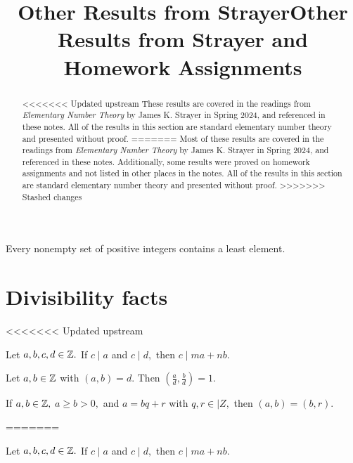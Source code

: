 \documentclass[letterpaper, 11 pt]{ximera}
\title{Other Results from Strayer}
\title{Other Results from Strayer and Homework Assignments}
\begin{document}
\begin{abstract}
<<<<<<< Updated upstream
    These results are covered in the readings from \emph{Elementary Number Theory} by James K. Strayer in Spring 2024, and referenced in these notes. All of the results in this section are standard elementary number theory and presented without proof. 
=======
    Most of these results are covered in the readings from \emph{Elementary Number Theory} by James K. Strayer in Spring 2024, and referenced in these notes. Additionally, some results were proved on homework assignments and not listed in other places in the notes.
    All of the results in this section are standard elementary number theory and presented without proof. 
>>>>>>> Stashed changes
\end{abstract}

\maketitle

\begin{axiom}\label{well-order}
    Every nonempty set of positive integers contains a least element.
\end{axiom}

\section{Divisibility facts}\label{sec:additional-div}

<<<<<<< Updated upstream
    \begin{lem*}[Proposition 1.2]\label{lem:linear-combo}
         Let $a,b,c,d\in\mathbb Z.$ If $c\mid a$ and $c\mid d,$ then $c\mid ma+nb.$
    \end{lem*}


    \begin{prop*}[Proposition 1.10]\label{prop:div-gcd-rel-prime}
        Let $a,b\in\mathbb Z$ with $(a,b)=d.$ Then $(\tfrac{a}{d},\tfrac{b}{d})=1.$
    \end{prop*}


    \begin{lem*}[Lemma 1.12]\label{lem:gcd-remainders}
     If $a,b\in\mathbb Z,$ $a\geq b\gt 0,$ and $a=bq+r$ with $q,r\in|Z,$ then $(a,b)=(b,r).$
    \end{lem*}
=======
    \begin{lemma}[Proposition 1.2]\label{lem:linear-combo}
         Let $a,b,c,d\in\mathbb Z.$ If $c\mid a$ and $c\mid d,$ then $c\mid ma+nb.$
    \end{lemma}
\end{document}
